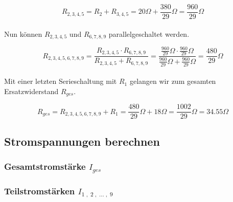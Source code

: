 \documentclass[a4paper,12pt]{article}
\begin{document}
$$R_{2,3,4,5} = R_2 + R_{3,4,5} = 20 \Omega + \frac{380}{29} \Omega = \frac{960}{29} \Omega$$\\

Nun können $R_{2,3,4,5}$ und $R_{6,7,8,9}$ parallelgeschaltet werden.

$$R_{2,3,4,5,6,7,8,9} = \frac{R_{2,3,4,5} \cdot R_{6,7,8,9}}{R_{2,3,4,5} + R_{6,7,8,9}} = \frac{\frac{960}{29}\Omega \cdot \frac{960}{29}\Omega}{\frac{960}{29}\Omega + \frac{960}{29}\Omega} = \frac{480}{29}\Omega$$\\

Mit einer letzten Serieschaltung mit $R_1$ gelangen wir zum gesamten Ersatzwiderstand $R_{ges}$.

$$R_{ges} = R_{2,3,4,5,6,7,8,9} + R_1 = \frac{480}{29}\Omega + 18\Omega = \frac{1002}{29}\Omega = 34.55\Omega$$

\subsection{Stromspannungen berechnen}

\subsubsection{Gesamtstromstärke $I_{ges}$}

\subsubsection{Teilstromstärken $I_{1\;,\;2\;,\; ...\;,\; 9}$}

\end{document}
